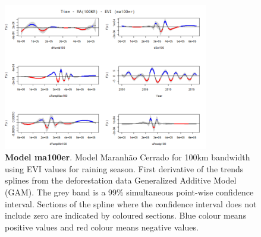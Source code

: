 \begin{table}

\begin{figure}[H]
 \centering
        \centering
        \includegraphics[width=0.8\textwidth]{ma100er.png} %
        \caption[Model Cerrado Maranhão for 100km bandwidth using EVI values for raining season. First derivative of the trends splines from the deforestation data Generalized Additive Model (GAM)]{\textbf{Model ma100er}. Model Maranhão Cerrado for 100km bandwidth using EVI values for raining season. First derivative of the trends splines from the deforestation data Generalized Additive Model (GAM). The grey band is a 99\% simultaneous point-wise confidence interval. Sections of the spline where the confidence interval does not include zero are indicated by coloured sections. Blue colour means positive values and red colour means negative values.}
\end{figure}
\end{table}

